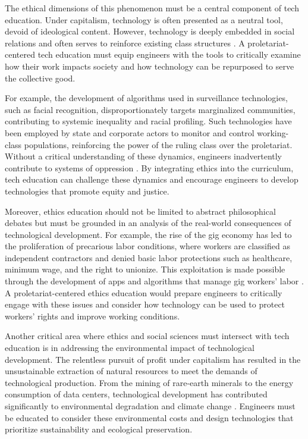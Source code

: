 \begin{refsection}
The ethical dimensions of this phenomenon must be a central component of tech education. Under capitalism, technology is often presented as a neutral tool, devoid of ideological content. However, technology is deeply embedded in social relations and often serves to reinforce existing class structures \cite[pp.~58]{noble2019algorithms}. A proletariat-centered tech education must equip engineers with the tools to critically examine how their work impacts society and how technology can be repurposed to serve the collective good.

For example, the development of algorithms used in surveillance technologies, such as facial recognition, disproportionately targets marginalized communities, contributing to systemic inequality and racial profiling. Such technologies have been employed by state and corporate actors to monitor and control working-class populations, reinforcing the power of the ruling class over the proletariat. Without a critical understanding of these dynamics, engineers inadvertently contribute to systems of oppression \cite[pp.~67]{eubanks2018automating}. By integrating ethics into the curriculum, tech education can challenge these dynamics and encourage engineers to develop technologies that promote equity and justice.

Moreover, ethics education should not be limited to abstract philosophical debates but must be grounded in an analysis of the real-world consequences of technological development. For example, the rise of the gig economy has led to the proliferation of precarious labor conditions, where workers are classified as independent contractors and denied basic labor protections such as healthcare, minimum wage, and the right to unionize. This exploitation is made possible through the development of apps and algorithms that manage gig workers' labor \cite[pp.~120]{davidson2015you}. A proletariat-centered ethics education would prepare engineers to critically engage with these issues and consider how technology can be used to protect workers' rights and improve working conditions.

Another critical area where ethics and social sciences must intersect with tech education is in addressing the environmental impact of technological development. The relentless pursuit of profit under capitalism has resulted in the unsustainable extraction of natural resources to meet the demands of technological production. From the mining of rare-earth minerals to the energy consumption of data centers, technological development has contributed significantly to environmental degradation and climate change \cite[pp.~220]{malm2016fossil}. Engineers must be educated to consider these environmental costs and design technologies that prioritize sustainability and ecological preservation.


\end{refsection}
